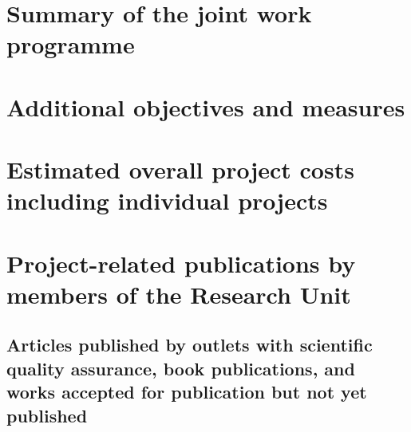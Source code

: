 \documentclass{scrartcl}
\begin{document}
\section{Summary of the joint work programme}
%
%


\section{Additional objectives and measures}
%


\section{Estimated overall project costs including individual projects}
%


%
%
\section{Project-related publications by members of the Research Unit}

\subsection{Articles published by outlets with scientific quality assurance, book publications, and works accepted for publication but not yet published}
\printbibliography[category=reviewed, heading=none]
\end{document}

